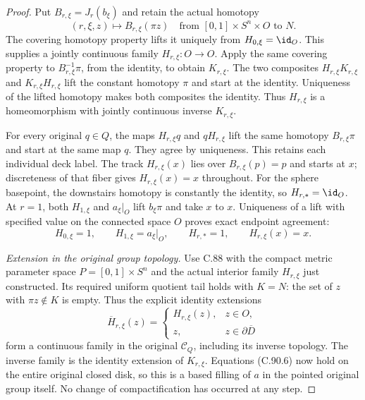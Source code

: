 \begin{proof}
Put $B_{r,\xi}=J_r(b_\xi)$ and retain
the actual homotopy
\[
 (r,\xi,z)\longmapsto B_{r,\xi}(\pi z)
          \quad\text{from }[0,1]\times S^n\times O\text{ to }N.
                                                               \tag{C.90.5}
\]
The covering homotopy property lifts it
uniquely from $H_{0,\xi}=\id_O$.
This supplies a jointly continuous
family $H_{r,\xi}:O\to O$.
Apply the same covering property to
$B_{r,\xi}^{-1}\pi$, from the identity,
to obtain $K_{r,\xi}$.
The two composites $H_{r,\xi}K_{r,\xi}$
and $K_{r,\xi}H_{r,\xi}$ lift the
constant homotopy $\pi$ and start at
the identity. Uniqueness of the lifted
homotopy makes both composites the
identity. Thus $H_{r,\xi}$ is a
homeomorphism with jointly continuous
inverse $K_{r,\xi}$.

For every original $q\in Q$, the maps
$H_{r,\xi}q$ and $qH_{r,\xi}$ lift
the same homotopy $B_{r,\xi}\pi$
and start at the same map $q$.
They agree by uniqueness. This retains
each individual deck label.
The track $H_{r,\xi}(x)$ lies over
$B_{r,\xi}(p)=p$ and starts at $x$;
discreteness of that fiber gives
$H_{r,\xi}(x)=x$ throughout.
For the sphere basepoint, the downstairs
homotopy is constantly the identity,
so $H_{r,*}=\id_O$.
At $r=1$, both $H_{1,\xi}$ and
$a_\xi|_O$ lift $b_\xi\pi$ and
take $x$ to $x$. Uniqueness of a lift
with specified value on the connected
space $O$ proves exact endpoint agreement:
\[
 H_{0,\xi}=1,\qquad H_{1,\xi}=a_\xi|_O,
       \qquad H_{r,*}=1,\qquad H_{r,\xi}(x)=x.
                                                               \tag{C.90.6}
\]

\emph{Extension in the original group topology.}
Use C.88 with the compact metric parameter
space $P=[0,1]\times S^n$ and the actual
interior family $H_{r,\xi}$ just constructed.
Its required uniform quotient tail holds
with $K=N$: the set of $z$ with
$\pi z\notin K$ is empty.
Thus the explicit identity extensions
\[
 \overline H_{r,\xi}(z)=
 \begin{cases}
 H_{r,\xi}(z),&z\in O,\\
 z,&z\in\partial\overline D
 \end{cases}
                                                               \tag{C.90.7}
\]
form a continuous family in the original
$\mathscr C_Q$, including its inverse
topology. The inverse family is the
identity extension of $K_{r,\xi}$.
Equations (C.90.6) now hold on the
entire original closed disk, so this
is a based filling of $a$ in the
pointed original group itself.
No change of compactification has
occurred at any step.


\end{proof}
